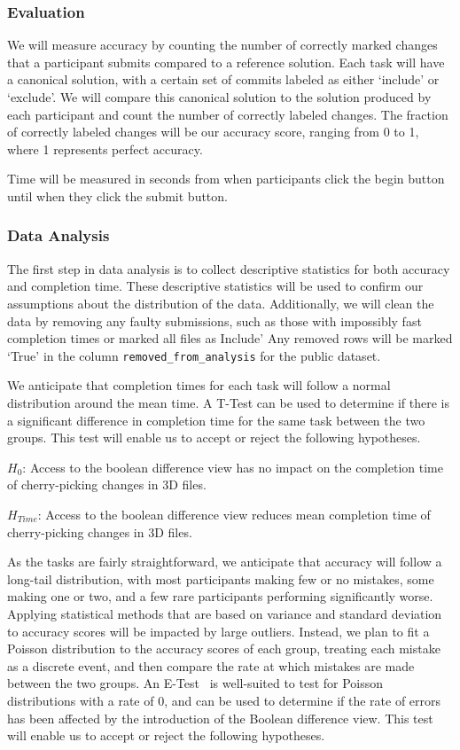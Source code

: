 \documentclass[sigconf,authorversion,nonacm]{acmart}
\begin{document}
\subsubsection{Evaluation}

We will measure accuracy by counting the number of correctly marked changes that a participant submits compared to a reference solution.
Each task will have a canonical solution, with a certain set of commits labeled as either `include' or `exclude'.
We will compare this canonical solution to the solution produced by each participant and count the number of correctly labeled changes.
The fraction of correctly labeled changes will be our accuracy score, ranging from 0 to 1, where 1 represents perfect accuracy.

Time will be measured in seconds from when participants click the begin button until when they click the submit button.

\subsubsection{Data Analysis}

The first step in data analysis is to collect descriptive statistics for both accuracy and completion time.
These descriptive statistics will be used to confirm our assumptions about the distribution of the data.
Additionally, we will clean the data by removing any faulty submissions, such as those with impossibly fast completion times or marked all files as Include'
Any removed rows will be marked `True' in the column \texttt{removed\_from\_analysis} for the public dataset.

We anticipate that completion times for each task will follow a normal distribution around the mean time.
A T-Test can be used to determine if there is a significant difference in completion time for the same task between the two groups.
This test will enable us to accept or reject the following hypotheses.

$H_{0}$: Access to the boolean difference view has no impact on the completion time of cherry-picking changes in 3D files.

$H_{Time}$: Access to the boolean difference view reduces mean completion time of cherry-picking changes in 3D files.

As the tasks are fairly straightforward, we anticipate that accuracy will follow a long-tail distribution, with most participants making few or no mistakes, some making one or two, and a few rare participants performing significantly worse.
Applying statistical methods that are based on variance and standard deviation to accuracy scores will be impacted by large outliers.
Instead, we plan to fit a Poisson distribution to the accuracy scores of each group, treating each mistake as a discrete event, and then compare the rate at which mistakes are made between the two groups.
An E-Test~\cite{krishnamoorthy2004more} is well-suited to test for Poisson distributions with a rate of 0, and can be used to determine if the rate of errors has been affected by the introduction of the Boolean difference view. This test will enable us to accept or reject the following hypotheses.
\end{document}
